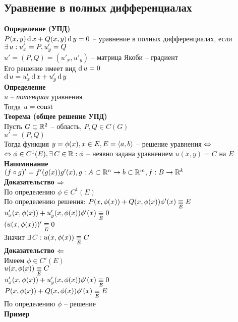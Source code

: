 \documentclass[12pt]{article}
\begin{document}
\subsection{Уравнение в полных дифференциалах}
\textbf{Определение (УПД)}\\
$P(x,y)\operatorname{d} x + Q(x,y)\operatorname{d} y = 0$ -- уравнение в полных дифференциалах, если $\exists\, u: u_x'=P, u_y' = Q$\\
$u' = (P, Q) = (u'_x, u'_y)$ -- матрица Якоби -- градиент\\
Его решение имеет вид $\operatorname{d} u = 0$\\
$\operatorname{d} u = u_x'\operatorname{d} x + u_y'\operatorname{d} y$\\
\textbf{Определение}\\
$u$ -- \textit{потенциал} уравнения\\
Тогда $u = \operatorname{const}$\\
\textbf{Теорема (общее решение УПД)}\\
Пусть $G \subset \mathbb{R}^2$ -- область, $P, Q \in C(G)$\\
$u'=(P, Q)$\\
Тогда функция $y = \phi(x), x \in E, E = \langle a, b \rangle$ -- решение уравнения $\Leftrightarrow$\\
$\Leftrightarrow \phi \in C^1(E), \exists\, C \in \mathbb{R}: \phi$ -- неявно задана уравнением $u(x,y) = C$ на $E$\\
\textbf{Напоминание}\\
$(f \circ g)' = f'(g(x))g'(x), g: A \subset \mathbb{R}^n \rightarrow b \subset \mathbb{R}^m, f: B \rightarrow \mathbb{R}^k$\\
\textbf{Доказательство $\Rightarrow$}\\
По определению $\phi \in C^1(E)$\\
По определению решения: $P(x, \phi(x)) + Q(x, \phi(x)) \phi'(x) \underset E\equiv E$\\
$u'_x(x, \phi(x))+u'_y(x, \phi(x))\phi'(x) \underset E \equiv 0$\\
$(u(x, \phi(x)))' \underset E\equiv 0$\\
Значит $\exists\, C: u(x, \phi(x)) \underset E\equiv C$\\
\textbf{Доказательство $\Leftarrow$}\\
Имеем $\phi \in C'(E)$\\
$u(x, \phi(x)) \underset E\equiv C$\\
$u'_x(x, \phi(x))+u'_y(x, \phi(x))\phi'(x) \underset E \equiv 0$\\
$P(x, \phi(x)) + Q(x, \phi(x)) \phi'(x) \underset E\equiv E$\\
По определению $\phi$ -- решение\\
\textbf{Пример}\\
\end{document}
